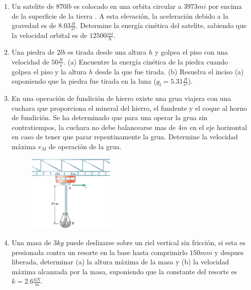 \begin{enumerate}

	\item Un satelite de $870 lb$  es colocado en una orbita circular a $3973 mi$ por encima de la superficie de la tierra . A esta elevación, la aceleración debido a la gravedad es de $8.03 \frac{ft}{s^2}$. Determine la energía cinética del satelite, sabiendo que la velocidad orbital es de $12500 \frac{mi}{h}$.

	\item Una piedra de $2 lb$ es tirada desde una altura $h$ y golpea el piso con una velocidad de $50 \frac{ft}{s}$. (a) Encuentre la energía cinética de la piedra cuando golpea el piso y la altura $h$ desde la que fue tirada. (b) Resuelva el inciso (a) suponiendo que la piedra fue tirada en la luna ($g_l = 5.31 \frac{ft}{s^2}$).

	\item En una operación de fundición de hierro existe una grua viajera con una cuchara que proporciona el mineral del hierro, el fundente y el coque al horno de fundición. Se ha determinado que para una operar la grua sin contratiempos, la cuchara no debe balancearse mas de $4m$ en el eje horizontal en caso de tener que parar repentinamente la grua. Determine la velocidad máxima $v_M$ de operación de la grua.

	\begin{figure}[h]
		\begin{center}
			\includegraphics[width=0.4\textwidth]{./images/grua.pdf}
		\end{center}
	\end{figure}

	\item Una masa de $3 kg$ puede deslizarse sobre un riel vertical sin fricción, si esta es presionada contra un resorte en la base hasta comprimirlo $150 mm$ y despues liberada, determinar (a) la altura máxima de la masa y (b) la velocidad máxima alcanzada por la masa, suponiendo que la constante del resorte es $k = 2.6 \frac{kN}{m}$.


\end{enumerate}
